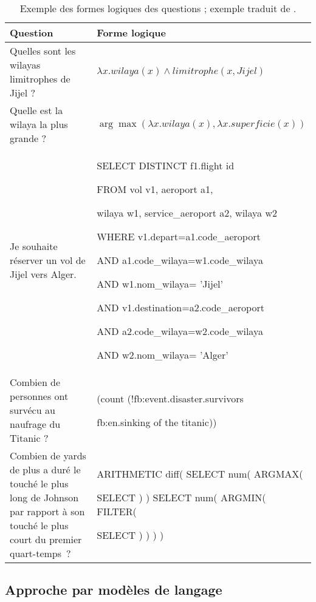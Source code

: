 \documentclass{KodeBook}
\begin{document}
\begin{table}[ht]
	\centering\small
	\begin{tabular}{p{}p{}}
		\hline\hline
		Question & Forme logique \\
		\hline
		Quelles sont les wilayas limitrophes de Jijel ? & $\lambda x.wilaya(x) \wedge limitrophe(x, Jijel)$ \\
		
		Quelle est la wilaya la plus grande ? & $\arg\max(\lambda x.wilaya(x), \lambda x.superficie(x))$ \\
		
		Je souhaite réserver un vol de Jijel vers Alger. & SELECT DISTINCT f1.flight id
		
		FROM vol v1, aeroport  a1,
		
		wilaya w1, service\_aeroport a2, wilaya w2
		
		WHERE v1.depart=a1.code\_aeroport
		
		AND a1.code\_wilaya=w1.code\_wilaya
	
		AND w1.nom\_wilaya= 'Jijel'
		
		AND v1.destination=a2.code\_aeroport
		
		AND a2.code\_wilaya=w2.code\_wilaya
		
		AND w2.nom\_wilaya= 'Alger' \\
		
		
		Combien de personnes ont survécu au naufrage du Titanic ? & (count (!fb:event.disaster.survivors
		
		fb:en.sinking of the titanic))\\
		
		Combien de yards de plus a duré le touché le plus long de Johnson par rapport à son touché le plus court du premier quart-temps ? & 
		ARITHMETIC diff( SELECT num( ARGMAX(
		
		SELECT ) ) SELECT num( ARGMIN( FILTER(
		
		SELECT ) ) ) )\\
		\hline\hline
	\end{tabular}
	\caption[Exemple des formes logiques des questions.]{Exemple des formes logiques des questions ; exemple traduit de \cite{2020-jurafsky-martin}.}
	\label{tab:qr-conn}
\end{table}

\subsection{Approche par modèles de langage}
\end{document}
